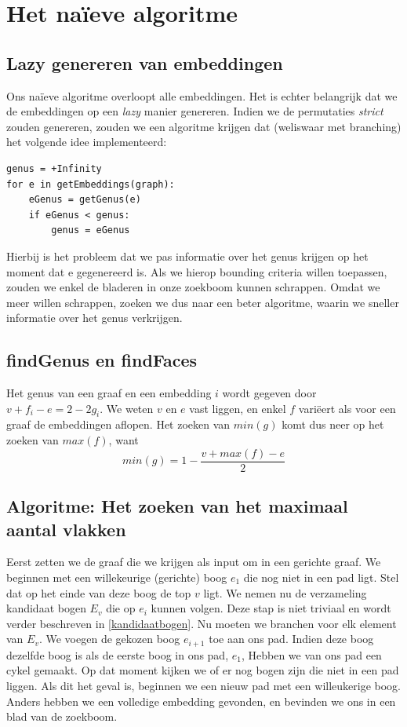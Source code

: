 \documentclass{article}
\begin{document}
\section{Het na\"ieve algoritme}
\label{het-naieve-algoritme}

\subsection{Lazy genereren van embeddingen}
Ons na\"ieve algoritme overloopt alle embeddingen. Het is echter belangrijk dat
we de embeddingen op een \emph{lazy} manier genereren. Indien we de permutaties
\emph{strict} zouden genereren, zouden we een algoritme krijgen dat (weliswaar
met branching) het volgende idee implementeerd:

\lstset{language=Python}
\begin{lstlisting}
genus = +Infinity
for e in getEmbeddings(graph):
    eGenus = getGenus(e)
    if eGenus < genus:
        genus = eGenus
\end{lstlisting}

Hierbij is het probleem dat we pas informatie over het genus krijgen op het
moment dat e gegenereerd is. Als we hierop bounding criteria willen toepassen,
zouden we enkel de bladeren in onze zoekboom kunnen schrappen. Omdat we meer
willen schrappen, zoeken we dus naar een beter algoritme, waarin we sneller
informatie over het genus verkrijgen.
\newline

\subsection{findGenus en findFaces}
Het genus van een graaf en een embedding $i$ wordt gegeven door
$v + f_i - e = 2 - 2g_i$. We weten $v$ en $e$ vast liggen, en enkel $f$ vari\"eert
als voor een graaf de embeddingen aflopen. Het zoeken van $min(g)$ komt dus
neer op het zoeken van $max(f)$, want
\begin{equation*}
min(g) = 1 - \frac{v + max(f) - e}{2}
\end{equation*}

\subsection{Algoritme: Het zoeken van het maximaal aantal vlakken}
Eerst zetten we de graaf die we krijgen als input om in een gerichte graaf. We
beginnen met een willekeurige (gerichte) boog $e_1$ die nog niet in een pad
ligt.  Stel dat op het einde van deze boog de top $v$ ligt. We nemen nu de
verzameling kandidaat bogen $E_v$ die op $e_i$ kunnen volgen. Deze stap is niet
triviaal en wordt verder beschreven in \ref{kandidaatbogen}. Nu moeten we branchen
voor elk element van $E_v$. We voegen de gekozen boog $e_{i+1}$ toe aan ons pad.
Indien deze boog dezelfde boog is als de eerste boog in ons pad, $e_1$, Hebben
we van ons pad een cykel gemaakt. Op dat moment kijken we of er nog bogen zijn
die niet in een pad liggen. Als dit het geval is, beginnen we een nieuw pad met
een willeukerige boog. Anders hebben we een volledige embedding gevonden, en
bevinden we ons in een blad van de zoekboom.
\end{document}
